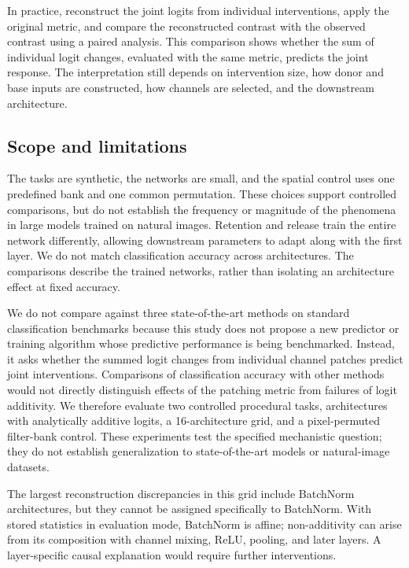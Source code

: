 \documentclass[pdflatex,sn-basic]{sn-jnl}
\begin{document}
In practice, reconstruct the joint logits from individual interventions, apply the original metric, and compare the reconstructed contrast with the observed contrast using a paired analysis. This comparison shows whether the sum of individual logit changes, evaluated with the same metric, predicts the joint response. The interpretation still depends on intervention size, how donor and base inputs are constructed, how channels are selected, and the downstream architecture.

\subsection{Scope and limitations}

The tasks are synthetic, the networks are small, and the spatial control uses one predefined bank and one common permutation. These choices support controlled comparisons, but do not establish the frequency or magnitude of the phenomena in large models trained on natural images. Retention and release train the entire network differently, allowing downstream parameters to adapt along with the first layer. We do not match classification accuracy across architectures. The comparisons describe the trained networks, rather than isolating an architecture effect at fixed accuracy.

We do not compare against three state-of-the-art methods on standard classification benchmarks because this study does not propose a new predictor or training algorithm whose predictive performance is being benchmarked. Instead, it asks whether the summed logit changes from individual channel patches predict joint interventions. Comparisons of classification accuracy with other methods would not directly distinguish effects of the patching metric from failures of logit additivity. We therefore evaluate two controlled procedural tasks, architectures with analytically additive logits, a 16-architecture grid, and a pixel-permuted filter-bank control. These experiments test the specified mechanistic question; they do not establish generalization to state-of-the-art models or natural-image datasets.

The largest reconstruction discrepancies in this grid include BatchNorm architectures, but they cannot be assigned specifically to BatchNorm. With stored statistics in evaluation mode, BatchNorm is affine; non-additivity can arise from its composition with channel mixing, ReLU, pooling, and later layers. A layer-specific causal explanation would require further interventions.
\end{document}
